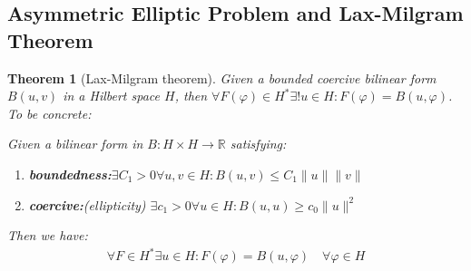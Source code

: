 \documentclass[a4paper,11pt,oneside,fleqn]{book}
\newtheorem{theorem}{Theorem}[section]
\theoremstyle{definition}
\theoremstyle{remark}
\begin{document}
\subsection{Asymmetric Elliptic Problem and Lax-Milgram Theorem}
\begin{theorem}[Lax-Milgram theorem]
	Given a bounded coercive bilinear form $B(u, v)$ in a Hilbert space $H$, then $\forall F(\varphi) \in H^* \exists!u \in H:F(\varphi) = B(u, \varphi)$. To be concrete:\par 
	Given a bilinear form in $B:H \times H \rightarrow \mathbb{R}$ satisfying:
	\begin{enumerate}
		\item \textbf{boundedness:}$\exists C_1>0\forall u, v\in H: B(u, v) \leq C_1 \|u\|\|v\|$
		\item \textbf{coercive:}(ellipticity) $\exists c_1 > 0 \forall u \in H: B(u, u) \geq c_0 \|u\|^2$
	\end{enumerate}
	Then we have:
	\begin{align*}
		\forall F \in H^* \exists u \in H: F(\varphi) = B(u, \varphi)\quad \forall \varphi \in H
	\end{align*}
\end{theorem}
\end{document}

